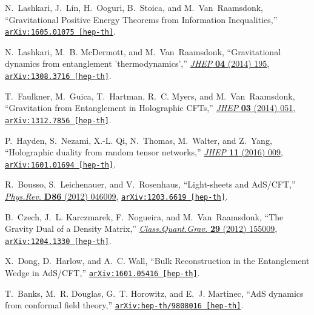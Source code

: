 \begin{thebibliography}{100}
N.~Lashkari, J.~Lin, H.~Ooguri, B.~Stoica, and M.~Van~Raamsdonk,
  ``{Gravitational Positive Energy Theorems from Information Inequalities},''
\href{http://arxiv.org/abs/1605.01075}{{\tt arXiv:1605.01075 [hep-th]}}.

N.~Lashkari, M.~B. McDermott, and M.~Van~Raamsdonk, ``{Gravitational dynamics
  from entanglement 'thermodynamics'},''
  \href{http://dx.doi.org/10.1007/JHEP04(2014)195}{{\em JHEP} {\bf 04} (2014)
  195},
\href{http://arxiv.org/abs/1308.3716}{{\tt arXiv:1308.3716 [hep-th]}}.

T.~Faulkner, M.~Guica, T.~Hartman, R.~C. Myers, and M.~Van~Raamsdonk,
  ``{Gravitation from Entanglement in Holographic CFTs},''
  \href{http://dx.doi.org/10.1007/JHEP03(2014)051}{{\em JHEP} {\bf 03} (2014)
  051},
\href{http://arxiv.org/abs/1312.7856}{{\tt arXiv:1312.7856 [hep-th]}}.

P.~Hayden, S.~Nezami, X.-L. Qi, N.~Thomas, M.~Walter, and Z.~Yang,
  ``{Holographic duality from random tensor networks},''
  \href{http://dx.doi.org/10.1007/JHEP11(2016)009}{{\em JHEP} {\bf 11} (2016)
  009},
\href{http://arxiv.org/abs/1601.01694}{{\tt arXiv:1601.01694 [hep-th]}}.

R.~Bousso, S.~Leichenauer, and V.~Rosenhaus, ``{Light-sheets and AdS/CFT},''
  \href{http://dx.doi.org/10.1103/PhysRevD.86.046009}{{\em Phys.Rev.} {\bf D86}
  (2012)  046009},
\href{http://arxiv.org/abs/1203.6619}{{\tt arXiv:1203.6619 [hep-th]}}.

B.~Czech, J.~L. Karczmarek, F.~Nogueira, and M.~Van~Raamsdonk, ``{The Gravity
  Dual of a Density Matrix},''
  \href{http://dx.doi.org/10.1088/0264-9381/29/15/155009}{{\em
  Class.Quant.Grav.} {\bf 29} (2012)  155009},
\href{http://arxiv.org/abs/1204.1330}{{\tt arXiv:1204.1330 [hep-th]}}.

X.~Dong, D.~Harlow, and A.~C. Wall, ``{Bulk Reconstruction in the Entanglement
  Wedge in AdS/CFT},''
\href{http://arxiv.org/abs/1601.05416}{{\tt arXiv:1601.05416 [hep-th]}}.

T.~Banks, M.~R. Douglas, G.~T. Horowitz, and E.~J. Martinec, ``{AdS dynamics
  from conformal field theory},''
\href{http://arxiv.org/abs/hep-th/9808016}{{\tt arXiv:hep-th/9808016
  [hep-th]}}.


\end{thebibliography}

